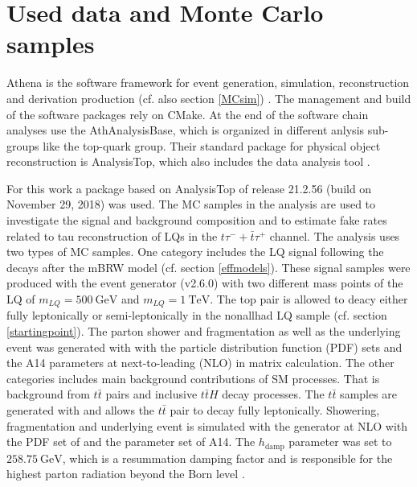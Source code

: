 \section{Used data and Monte Carlo samples}\label{MCsamples}
Athena is the {\ATLAS} software framework for event generation, simulation, reconstruction and derivation production (cf. also section \ref{MCsim}) \cite{Athena}. The management and build of the software packages rely on CMake. At the end of the software chain analyses use the AthAnalysisBase, which is organized in different anlysis sub-groups like the top-quark group. Their standard package for physical object reconstruction is AnalysisTop, which also includes the data analysis tool {\ROOT}.\par
For this work a package based on AnalysisTop of release 21.2.56 (build on November 29, 2018) was used.\newline
The MC samples in the analysis are used to investigate the signal and background composition and to estimate fake rates related to tau reconstruction of LQs in the $t\tau^{-}+\bar{t}\tau^{+}$ channel. The analysis uses two types of MC samples. One category includes the LQ signal following the decays after the mBRW model (cf. section \ref{effmodels}). These signal samples were produced with the event generator {\aMCNLO} (v2.6.0) \cite{aMCNlo} with two different mass points of the LQ of $m_{LQ}=\SI{500}{\giga\electronvolt}$ and $m_{LQ}=\SI{1}{\tera\electronvolt}$. The top pair is allowed to deacy either fully leptonically or semi-leptonically in the nonallhad LQ sample (cf. section \ref{startingpoint}). The parton shower and fragmentation as well as the underlying event was generated with {\Pythia} \cite{Pythia8} with the particle distribution function (PDF) sets {\NNPDFd} \cite{NNPDF} and the A14 \cite{A14} parameters at next-to-leading (NLO) in matrix calculation. \newline         
The other categories includes main background contributions of SM processes. That is background from $t\bar{t}$ pairs and inclusive $t\bar{t}H$ decay processes. The $t\bar{t}$ samples are generated with {\POWHEG} \cite{Powheg} and allows the $t\bar{t}$ pair to decay fully leptonically. Showering, fragmentation and underlying event is simulated with the generator {\Pythia} at NLO with the PDF set of {\NNPDFz} and the parameter set of A14. The $h_\text{damp}$ parameter was set to $\SI{258.75}{\giga\electronvolt}$, which is a resummation damping factor and is responsible for the highest parton radiation beyond the Born level \cite{hdamp}.\newline
